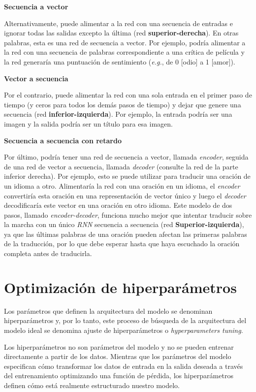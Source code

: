 \documentclass[a4paper,12pt]{article}
\begin{document}
\textbf{Secuencia a vector}

Alternativamente, puede alimentar a la red con una secuencia de entradas e ignorar todas las salidas excepto la última (red \textbf{superior-derecha}). En otras palabras, esta es una red de secuencia a vector. Por ejemplo, podría alimentar a la red con una secuencia de palabras correspondiente a una crítica de película y la red generaría una puntuación de sentimiento (\textit{e.g.}, de 0 [odio] a 1 [amor]).

\textbf{Vector a secuencia}

Por el contrario, puede alimentar la red con una sola entrada en el primer paso de tiempo (y ceros para todos los demás pasos de tiempo) y dejar que genere una secuencia (red \textbf{inferior-izquierda}). Por ejemplo, la entrada podría ser una imagen y la salida podría ser un título para esa imagen.

\textbf{Secuencia a secuencia con retardo}

Por último, podría tener una red de secuencia a vector, llamada \textit{encoder}, seguida de una red de vector a secuencia, llamada \textit{decoder} (consulte la red de la parte inferior derecha). Por ejemplo, esto se puede utilizar para traducir una oración de un idioma a otro. Alimentaría la red con una oración en un idioma, el \textit{encoder} convertiría esta oración en una representación de vector único y luego el \textit{decoder} decodificaría este vector en una oración en otro idioma. Este modelo de dos pasos, llamado \textit{encoder-decoder}, funciona mucho mejor que intentar traducir sobre la marcha con un único \textit{RNN} secuencia a secuencia (red \textbf{Superior-izquierda}), ya que las últimas palabras de una oración pueden afectan las primeras palabras de la traducción, por lo que debe esperar hasta que haya escuchado la oración completa antes de traducirla.

\clearpage
\section{Optimización de hiperparámetros} \label{tuning-hp}
Los parámetros que definen la arquitectura del modelo se denominan hiperparámetros y, por lo tanto, este proceso de búsqueda de la arquitectura del modelo ideal se denomina ajuste de hiperparámetros o \textit{hyperparameters tuning}. \citep{Koehrsen2018Jul}

Los hiperparámetros no son parámetros del modelo y no se pueden entrenar directamente a partir de los datos. Mientras que los parámetros del modelo especifican cómo transformar los datos de entrada en la salida deseada a través del entrenamiento optimizando una función de pérdida, los hiperparámetros definen cómo está realmente estructurado nuestro modelo.
\end{document}
